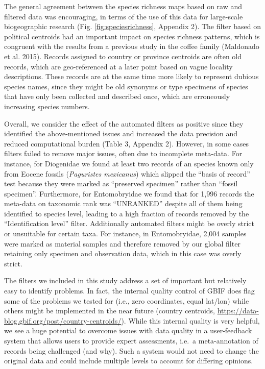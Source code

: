 \documentclass[fleqn,10pt,lineno]{wlpeerj} %
\begin{document}
The general agreement between the species richness maps based on raw and filtered data was encouraging, in terms of the use of this data for large-scale biogeographic research (Fig. \ref{fig:speciesrichness}, Appendix 2). The filter based on political centroids had an important impact on species richness patterns, which is congruent with the results from a previous study in the coffee family (Maldonado et al. 2015). Records assigned to country or province centroids are often old records, which are geo-referenced at a later point based on vague locality descriptions. These records are at the same time more likely to represent dubious species names, since they might be old synonyms or type specimens of species that have only been collected and described once, which are erroneously increasing species numbers.

Overall, we consider the effect of the automated filters as positive since they identified the above-mentioned issues and increased the data precision and reduced computational burden (Table 3, Appendix 2). However, in some cases filters failed to remove major issues, often due to incomplete meta-data. For instance, for Diogenidae we found at least two records of an species known only from Eocene fossils (\emph{Paguristes mexicanus}) which slipped the ``basis of record'' test because they were marked as ``preserved specimen'' rather than ``fossil specimen''. Furthermore, for Entomobryidae we found that for 1,996 records the meta-data on taxonomic rank was ``UNRANKED'' despite all of them being identified to species level, leading to a high fraction of records removed by the ``Identification level'' filter. Additionally automated filters might be overly strict or unsuitable for certain taxa. For instance, in Entomobryidae, 2,004 samples were marked as material samples and therefore removed by our global filter retaining only specimen and observation data, which in this case was overly strict.

The filters we included in this study address a set of important but relatively easy to identify problems. In fact, the internal quality control of GBIF does flag some of the problems we tested for (i.e., zero coordinates, equal lat/lon) while others might be implemented in the near future (country centroids, \url{https://data-blog.gbif.org/post/country-centroids/}). While this internal quality is very helpful, we see a huge potential to overcome issues with data quality in a user-feedback system that allows users to provide expert assessments, i.e.~a meta-annotation of records being challenged (and why). Such a system would not need to change the original data and could include multiple levels to account for differing opinions.
\end{document}
